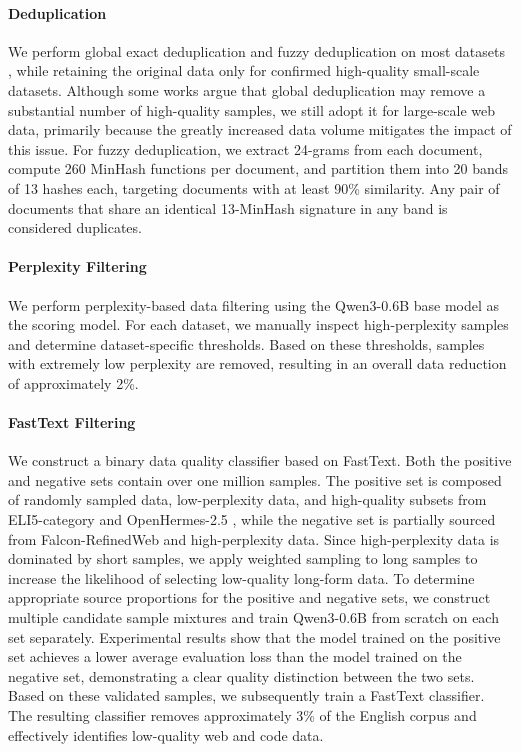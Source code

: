 \paragraph{Deduplication} We perform global exact deduplication and fuzzy deduplication on most datasets \cite{lee2022deduplicating}, while retaining the original data only for confirmed high-quality small-scale datasets. Although some works \cite{penedo2024fineweb, penedo2025fineweb2} argue that global deduplication may remove a substantial number of high-quality samples, we still adopt it for large-scale web data, primarily because the greatly increased data volume mitigates the impact of this issue.
For fuzzy deduplication, we extract 24-grams from each document, compute 260 MinHash functions per document, and partition them into 20 bands of 13 hashes each, targeting documents with at least 90\% similarity. Any pair of documents that share an identical 13-MinHash signature in any band is considered duplicates.

\paragraph{Perplexity Filtering} We perform perplexity-based data filtering using the Qwen3-0.6B base model as the scoring model. For each dataset, we manually inspect high-perplexity samples and determine dataset-specific thresholds. Based on these thresholds, samples with extremely low perplexity are removed, resulting in an overall data reduction of approximately 2\%.

\paragraph{FastText Filtering} 
We construct a binary data quality classifier based on FastText. Both the positive and negative sets contain over one million samples. The positive set is composed of randomly sampled data, low-perplexity data, and high-quality subsets from ELI5-category \cite{fan2019eli5} and OpenHermes-2.5 \cite{OpenHermes2.5}, while the negative set is partially sourced from Falcon-RefinedWeb \cite{penedo2023refinedweb} and high-perplexity data. 
Since high-perplexity data is dominated by short samples, we apply weighted sampling to long samples to increase the likelihood of selecting low-quality long-form data.
To determine appropriate source proportions for the positive and negative sets, we construct multiple candidate sample mixtures and train Qwen3-0.6B from scratch on each set separately. 
Experimental results show that the model trained on the positive set achieves a lower average evaluation loss than the model trained on the negative set, demonstrating a clear quality distinction between the two sets. 
Based on these validated samples, we subsequently train a FastText classifier. The resulting classifier removes approximately 3\% of the English corpus and effectively identifies low-quality web and code data.

